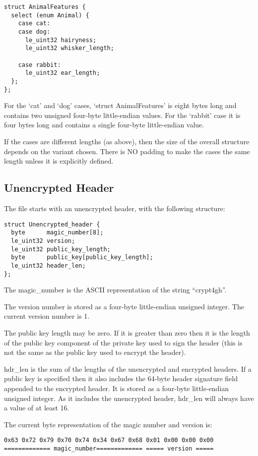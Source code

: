 \documentclass[10pt]{article}
\begin{document}
\begin{verbatim}
struct AnimalFeatures {
  select (enum Animal) {
    case cat:
    case dog:
      le_uint32 hairyness;
      le_uint32 whisker_length;

    case rabbit:
      le_uint32 ear_length;
  };
};
\end{verbatim}

For the `cat' and `dog' cases, `struct AnimalFeatures' is eight bytes long and contains two unsigned four-byte
little-endian values.
For the `rabbit' case it is four bytes long and contains a single four-byte little-endian value.

If the cases are different lengths (as above), then the size of the overall structure depends on the variant chosen.
There is NO padding to make the cases the same length unless it is explicitly defined.

\subsection{Unencrypted Header}

The file starts with an unencrypted header, with the following structure:

\begin{verbatim}
struct Unencrypted_header {
  byte      magic_number[8];
  le_uint32 version;
  le_uint32 public_key_length;
  byte      public_key[public_key_length];
  le_uint32 header_len;
};
\end{verbatim}

The magic\_number is the ASCII representation of the string ``crypt4gh''.

The version number is stored as a four-byte little-endian unsigned integer.
The current version number is 1.

The public key length may be zero.
If it is greater than zero then it is the length of the public key component of the private key used to sign the
header (this is not the same as the public key used to encrypt the header).

hdr\_len is the sum of the lengths of the unencrypted and encrypted headers.
If a public key is specified then it also includes the 64-byte header signature field appended to the encrypted header.
It is stored as a four-byte little-endian unsigned integer.
As it includes the unencrypted header, hdr\_len will always have a value of at least 16.

The current byte representation of the magic number and version is:
\begin{verbatim}
0x63 0x72 0x79 0x70 0x74 0x34 0x67 0x68 0x01 0x00 0x00 0x00
============= magic_number============= ===== version =====
\end{verbatim}
\end{document}

